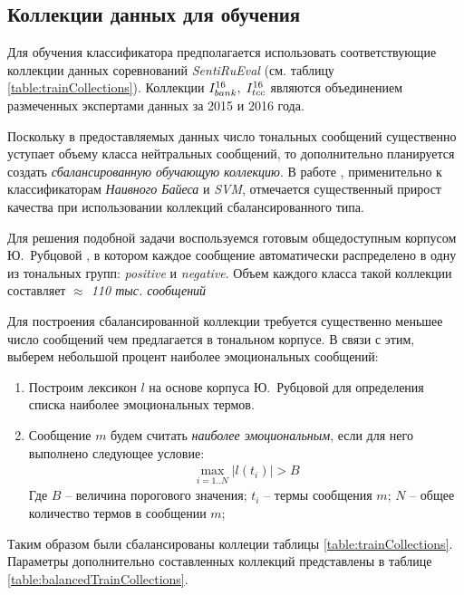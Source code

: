 \subsection{Коллекции данных для обучения}
    \label{sec:train}
    Для обучения классификатора предполагается использовать соответствующие
    коллекции данных соревнований {\it SentiRuEval} (см. таблицу
    \ref{table:trainCollections}).
    Коллекции $I_{bank}^{16}, \hspace{0.1cm} I_{tcc}^{16}$ являются объединением
    размеченных экспертами данных за 2015 и 2016 года.

    

    Поскольку в предоставляемых
    данных число тональных сообщений существенно уступает объему класса
    нейтральных сообщений, то дополнительно планируется создать {\it сбалансированную
    обучающую коллекцию}.
    В работе \cite{diploma2015}, применительно к классификаторам {\it
    Наивного Байеса} и {\it SVM}, отмечается существенный прирост качества при
    использовании коллекций сбалансированного типа.

    Для решения подобной задачи воспользуемся готовым общедоступным корпусом Ю.~Рубцовой
    \cite{rubtsovaCollection}, в
    котором каждое сообщение автоматически распределено в одну из тональных групп:
    {\it positive} и {\it negative}.
    Объем каждого класса такой коллекции составляет {\it $\approx$ 110 тыс.
    сообщений}

    Для построения сбалансированной коллекции требуется существенно меньшее
    число сообщений чем предлагается в тональном корпусе.
    В связи с этим, выберем небольшой процент наиболее эмоциональных сообщений:
    \begin{enumerate}
        \item Построим лексикон $l$ на основе корпуса Ю.~Рубцовой для определения
            списка наиболее эмоциональных термов.
        \item Сообщение $m$ будем считать {\it наиболее эмоциональным},
            если для него выполнено следующее условие:
            \begin{gather}
                \max\limits_{i=1..N} |l(t_i)| > B
            \end{gather}
            Где $B$ -- величина порогового значения; \hspace{0.5pt}
            $t_i$ -- термы сообщения $m$; \hspace{0.5pt}
            $N$ -- общее количество термов в сообщении $m$;
    \end{enumerate}

    Таким образом были сбалансированы коллеции таблицы \ref{table:trainCollections}.
    Параметры дополнительно составленных коллекций представлены
    в таблице \ref{table:balancedTrainCollections}.

    
